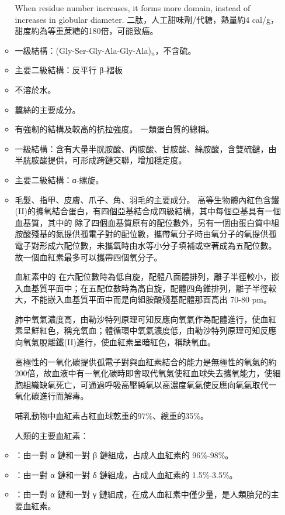\documentclass[a4paper,12pt]{report}
\begin{document}
\begin{itemize}
\begin{itemize}
When residue number increases, it forms more domain, instead of increases in globular diameter.
二肽，人工甜味劑/代糖，熱量約4 cal/g，甜度約為等重蔗糖的180倍，可能致癌。
\bit
\item 一級結構：(Gly-Ser-Gly-Ala-Gly-Ala)$_n$，不含硫。
\item 主要二級結構：反平行 β-褶板
\item 不溶於水。
\item 蠶絲的主要成分。
\item 有強韌的結構及較高的抗拉強度。
\eit
{}
一類蛋白質的總稱。
\bit
\item 一級結構：含有大量半胱胺酸、丙胺酸、甘胺酸、絲胺酸，含雙硫鍵，由半胱胺酸提供，可形成跨鏈交聯，增加穩定度。
\item 主要二級結構：α-螺旋。
\item 毛髮、指甲、皮膚、爪子、角、羽毛的主要成分。
\eit
{}
高等生物體內紅色含鐵(II)的攜氧結合蛋白，有四個亞基結合成四級結構，其中每個亞基具有一個血基質，其中的  除了四個血基質原有的配位數外，另有一個由蛋白質中組胺酸殘基的氮提供孤電子對的配位數，攜帶氧分子時由氧分子的氧提供孤電子對形成六配位數，未攜氧時由水等小分子填補或空著成為五配位數。故一個血紅素最多可以攜帶四個氧分子。

血紅素中的  在六配位數時為低自旋，配體八面體排列，離子半徑較小，嵌入血基質平面中；在五配位數時為高自旋，配體四角錐排列，離子半徑較大，不能嵌入血基質平面中而是向組胺酸殘基配體那面高出 70-80 pm。

肺中氧氣濃度高，由勒沙特列原理可知反應向氧氣作為配體進行，使血紅素呈鮮紅色，稱充氧血；體循環中氧氣濃度低，由勒沙特列原理可知反應向氧氣脫離鐵(II)進行，使血紅素呈暗紅色，稱缺氧血。

高極性的一氧化碳提供孤電子對與血紅素結合的能力是無極性的氧氣的約200倍，故血液中有一氧化碳時即會取代氧氣使紅血球失去攜氧能力，使細胞組織缺氧死亡，可通過呼吸高壓純氧以高濃度氧氣使反應向氧氣取代一氧化碳進行而解毒。

哺乳動物中血紅素占紅血球乾重的97\%、總重的35\%。

人類的主要血紅素：
\bit
\item {}：由一對 α 鏈和一對 β 鏈組成，占成人血紅素的 96\%-98\%。
\item {}：由一對 α 鏈和一對 δ 鏈組成，占成人血紅素的 1.5\%-3.5\%。
\item {}：由一對 α 鏈和一對 γ 鏈組成，在成人血紅素中僅少量，是人類胎兒的主要血紅素。 
\eit

\end{itemize}
\end{itemize}
\end{document}
